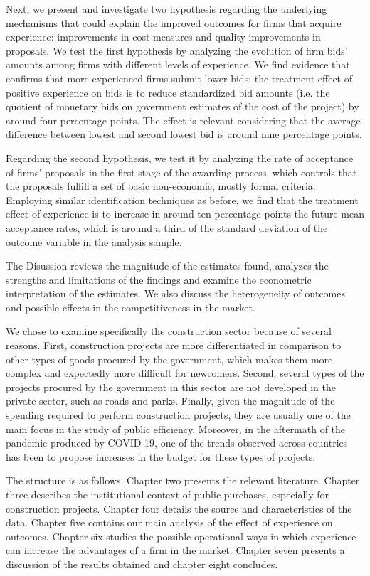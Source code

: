  Next, we present and investigate two hypothesis regarding the underlying mechanisms that could explain the improved outcomes for firms that acquire experience: improvements in cost measures and quality improvements in proposals. We test the first hypothesis by analyzing the evolution of firm bids' amounts among firms with different levels of experience. We find evidence that confirms that more experienced firms submit lower bids: the treatment effect of positive experience on bids is to reduce standardized bid amounts (i.e. the quotient of monetary bids on government estimates of the cost of the project) by around four percentage points. The effect is relevant considering that the average difference between lowest and second lowest bid is around nine percentage points.

Regarding the second hypothesis, we test it by analyzing the rate of acceptance of firms' proposals in the first stage of the awarding process, which controls that the proposals fulfill a set of basic non-economic, mostly formal criteria.  Employing similar identification techniques as before, we find that the treatment effect of experience is to increase in around ten percentage points the future mean acceptance rates, which is around a third of the standard deviation of the outcome variable in the analysis sample.

The Disussion reviews the magnitude of the estimates found, analyzes the strengths and limitations of the findings and examine the econometric interpretation of the estimates. We also discuss the heterogeneity of outcomes and possible effects in the competitiveness in the market.

We chose to examine specifically the construction sector because of several reasons. First, construction projects are more differentiated in comparison to other types of goods procured by the government, which makes them more complex and expectedly more difficult for newcomers. Second, several types of the projects procured by the government in this sector are not developed in the private sector, such as roads and parks. Finally, given the magnitude of the spending required to perform construction projects, they are usually one of the main focus in the study of public efficiency. Moreover, in the aftermath of the pandemic produced by COVID-19, one of the trends observed across countries has been to propose increases in the budget for these types of projects.

The structure is as follows. Chapter two presents the relevant literature. Chapter three describes the institutional context of public purchases, especially for construction projects. Chapter four  details the source and characteristics of the data. Chapter five contains our main analysis of the effect of experience on outcomes. Chapter six studies the possible operational ways in which experience can increase the advantages of a firm in the market. Chapter seven presents a discussion of the results obtained and chapter eight concludes.
